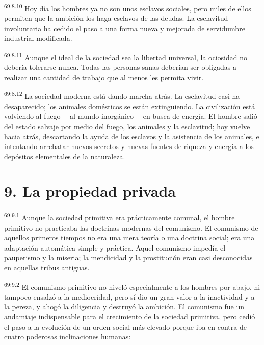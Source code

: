 \par
\textsuperscript{69:8.10} Hoy día los hombres ya no son unos esclavos sociales, pero miles de ellos permiten que la ambición los haga esclavos de las deudas. La esclavitud involuntaria ha cedido el paso a una forma nueva y mejorada de servidumbre industrial modificada.

\par
\textsuperscript{69:8.11} Aunque el ideal de la sociedad sea la libertad universal, la ociosidad no debería tolerarse nunca. Todas las personas sanas deberían ser obligadas a realizar una cantidad de trabajo que al menos les permita vivir.

\par
\textsuperscript{69:8.12} La sociedad moderna está dando marcha atrás. La esclavitud casi ha desaparecido; los animales domésticos se están extinguiendo. La civilización está volviendo al fuego ---al mundo inorgánico--- en busca de energía. El hombre salió del estado salvaje por medio del fuego, los animales y la esclavitud; hoy vuelve hacia atrás, descartando la ayuda de los esclavos y la asistencia de los animales, e intentando arrebatar nuevos secretos y nuevas fuentes de riqueza y energía a los depósitos elementales de la naturaleza.

\section*{9. La propiedad privada}
\par
\textsuperscript{69:9.1} Aunque la sociedad primitiva era prácticamente comunal, el hombre primitivo no practicaba las doctrinas modernas del comunismo. El comunismo de aquellos primeros tiempos no era una mera teoría o una doctrina social; era una adaptación automática simple y práctica. Aquel comunismo impedía el pauperismo y la miseria; la mendicidad y la prostitución eran casi desconocidas en aquellas tribus antiguas.

\par
\textsuperscript{69:9.2} El comunismo primitivo no niveló especialmente a los hombres por abajo, ni tampoco ensalzó a la mediocridad, pero sí dio un gran valor a la inactividad y a la pereza, y ahogó la diligencia y destruyó la ambición. El comunismo fue un andamiaje indispensable para el crecimiento de la sociedad primitiva, pero cedió el paso a la evolución de un orden social más elevado porque iba en contra de cuatro poderosas inclinaciones humanas:

